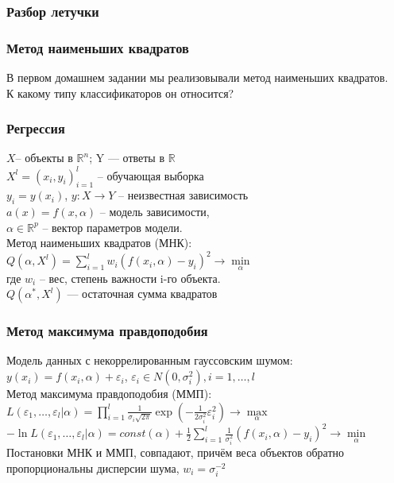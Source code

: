\documentclass[12pt]{beamer}
\subtitle{Лекция 11. Линейная регрессия. PCA. AUC.}
\begin{document}
	
\frame{\titlepage}

\begin{frame}\frametitle{Разбор летучки}

\end{frame}

\begin{frame}\frametitle{Метод наименьших квадратов}
В первом домашнем задании мы реализовывали метод наименьших квадратов.\\
К какому типу классификаторов он относится?
\end{frame}

\begin{frame}\frametitle{Регрессия}
$X$-- объекты в $\mathbb{R}^n$; Y — ответы в $\mathbb{R}$\\
$X^l = (x_i, y_i)_{i=1}^l$ -- обучающая выборка\\
$y_i = y(x_i)$,  $y : X \rightarrow Y$ -- неизвестная зависимость\\
\vspace{5mm}
$a(x) = f (x, \alpha)$ -- модель зависимости,\\
$\alpha \in \mathbb{R}^p$ -- вектор параметров модели.\\
\vspace{5mm}
Метод наименьших квадратов (МНК):\\
$Q(\alpha,X^l) = \sum\limits_{i=1}^l w_i (f (x_i, \alpha) - y_i)^2 \rightarrow \min\limits_{\alpha}$\\
где $w_i$ -- вес, степень важности i-го объекта.\\
$Q(\alpha^*,X^l)$ — остаточная сумма квадратов

\end{frame}

\begin{frame}\frametitle{Метод максимума правдоподобия}
Модель данных с некоррелированным гауссовским шумом:\\
$y(x_i) = f (x_i, \alpha) + \varepsilon_i$, $\varepsilon_i \in N (0, \sigma_i^2), i = 1, \dots, l$\\
Метод максимума правдоподобия (ММП):\\
$L(\varepsilon_1, \dots, \varepsilon_l | \alpha) = \prod\limits_{i=1}^l \frac{1}{\sigma_i \sqrt{2\pi}} \exp (-\frac{1}{2\sigma_i^2} \varepsilon_i^2 ) \rightarrow \max\limits_{\alpha}$\\
$- \ln L(\varepsilon_1, \dots, \varepsilon_l| \alpha) = const(\alpha) + \frac{1}{2} \sum\limits_{i=1}^l \frac{1}{\sigma_i^2} (f(x_i, \alpha) - y_i)^2 \rightarrow \min\limits_{\alpha}$\\
\vspace{5mm}
Постановки МНК и ММП, совпадают, причём веса объектов
обратно пропорциональны дисперсии шума, $w_i = \sigma_i^{-2}$
\end{frame}
\end{document}
